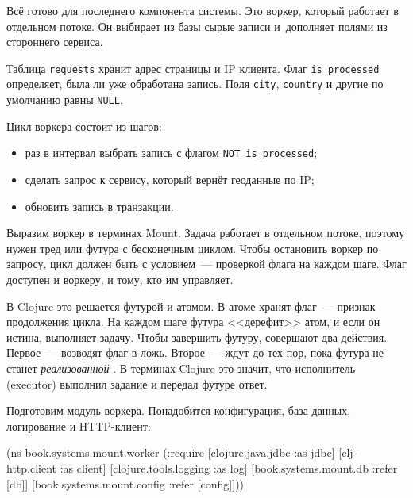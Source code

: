 Всё готово для последнего компонента системы. Это воркер, который работает в
отдельном потоке. Он выбирает из базы сырые записи и~дополняет полями из
стороннего сервиса.

Таблица \verb|requests| хранит адрес страницы и IP клиента. Флаг
\verb|is_processed| определяет, была ли уже обработана запись. Поля \verb|city|,
\verb|country| и другие по умолчанию равны \verb|NULL|.


Цикл воркера состоит из шагов:

\begin{itemize}

\item
  раз в интервал выбрать запись с флагом \verb|NOT is_processed|;

\item
  сделать запрос к сервису, который вернёт геоданные по IP;

\item
  обновить запись в транзакции.

\end{itemize}

Выразим воркер в терминах Mount. Задача работает в отдельном потоке, поэтому
нужен тред или футура с бесконечным циклом. Чтобы остановить воркер по запросу,
цикл должен быть с условием~--- проверкой флага на каждом шаге. Флаг доступен и
воркеру, и тому, кто им управляет.


В Clojure это решается футурой и атомом. В атоме хранят флаг~--- признак
продолжения цикла. На каждом шаге футура <<дерефит>> атом, и если он истина,
выполняет задачу. Чтобы завершить футуру, совершают два действия. Первое~---
возводят флаг в ложь. Второе~--- ждут до тех пор, пока футура не станет
\emph{реализованной} . В терминах Clojure это значит, что
исполнитель (executor) выполнил задание и передал футуре ответ.

Подготовим модуль воркера. Понадобится конфигурация, база данных, логирование и
HTTP-клиент:

\ifx\DEVICETYPE\MOBILE

\begin{english}
  \begin{clojure}
(ns book.systems.mount.worker
  (:require
   [clojure.java.jdbc :as jdbc]
   [clj-http.client :as client]
   [clojure.tools.logging :as log]
   [book.systems.mount.db :refer [db]]
   [book.systems.mount.config
    :refer [config]]))
  \end{clojure}
\end{english}

